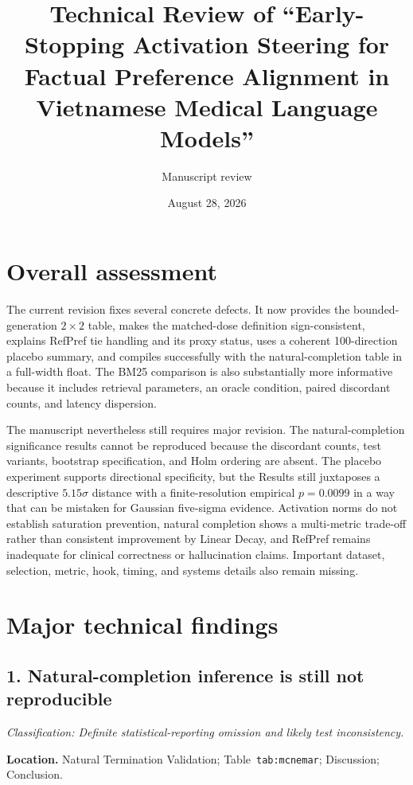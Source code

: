 \documentclass[11pt]{article}
\title{Technical Review of ``Early-Stopping Activation Steering for Factual Preference Alignment in Vietnamese Medical Language Models''}
\author{Manuscript review}
\date{August 28, 2026}
\newcommand{\findinglabel}[1]{\textbf{#1}}
\newcommand{\classification}[1]{\textit{Classification: #1.}}
\begin{document}
\maketitle

\section*{Overall assessment}

The current revision fixes several concrete defects.  It now provides the bounded-generation $2\times2$ table, makes the matched-dose definition sign-consistent, explains RefPref tie handling and its proxy status, uses a coherent 100-direction placebo summary, and compiles successfully with the natural-completion table in a full-width float.  The BM25 comparison is also substantially more informative because it includes retrieval parameters, an oracle condition, paired discordant counts, and latency dispersion.

The manuscript nevertheless still requires major revision.  The natural-completion significance results cannot be reproduced because the discordant counts, test variants, bootstrap specification, and Holm ordering are absent.  The placebo experiment supports directional specificity, but the Results still juxtaposes a descriptive $5.15\sigma$ distance with a finite-resolution empirical $p=0.0099$ in a way that can be mistaken for Gaussian five-sigma evidence.  Activation norms do not establish saturation prevention, natural completion shows a multi-metric trade-off rather than consistent improvement by Linear Decay, and RefPref remains inadequate for clinical correctness or hallucination claims.  Important dataset, selection, metric, hook, timing, and systems details also remain missing.

\section*{Major technical findings}

\subsection*{1. Natural-completion inference is still not reproducible}

\classification{Definite statistical-reporting omission and likely test inconsistency}

\findinglabel{Location.} Natural Termination Validation; Table~\texttt{tab:mcnemar}; Discussion; Conclusion.
\end{document}
